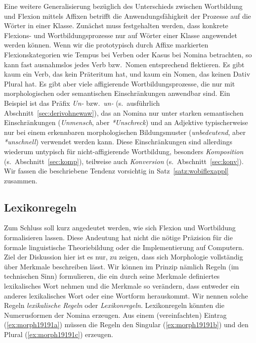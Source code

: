 Eine weitere Generalisierung bezüglich des Unterschieds zwischen Wortbildung und Flexion mittels Affixen betrifft die Anwendungsfähigkeit der Prozesse auf die Wörter in einer Klasse.
Zunächst muss festgehalten werden, dass konkrete Flexions- und Wortbildungsprozesse nur auf Wörter einer Klasse angewendet werden können.
Wenn wir die prototypisch durch Affixe markierten Flexionskategorien wie Tempus bei Verben oder Kasus bei Nomina betrachten, so kann fast ausnahmslos jedes Verb bzw.\ Nomen entsprechend flektieren.
Es gibt \zB kaum ein Verb, das kein Präteritum hat, und kaum ein Nomen, das keinen Dativ Plural hat.
Es gibt aber viele affigierende Wortbildungsprozesse, die nur mit morphologischen oder semantischen Einschränkungen anwendbar sind.
Ein Beispiel ist das Präfix \textit{Un-} bzw.\ \textit{un-} (s.\ ausführlich Abschnitt~\ref{sec:derivohnewaw}), das an Nomina nur unter starken semantischen Einschränkungen (\textit{Unmensch}, aber \textit{*Unschreck}) und an Adjektive typischerweise nur bei einem erkennbaren morphologischen Bildungsmuster (\textit{unbedeutend}, aber \textit{*unschnell}) verwendet werden kann.
Diese Einschränkungen sind allerdings wiederum untypisch für nicht-affigierende Wortbildung, besonders \textit{Komposition} (s.\ Abschnitt~\ref{sec:komp}), teilweise auch \textit{Konversion} (s.\ Abschnitt~\ref{sec:konv}).
Wir fassen die beschriebene Tendenz vorsichtig in Satz~\ref{satz:wobiflexappl} zusammen.



\subsection{Lexikonregeln}

\label{sec:lexikonregel}

Zum Schluss soll kurz angedeutet werden, wie sich Flexion und Wortbildung formalisieren lassen.
Diese Andeutung hat nicht die nötige Präzision für die formale linguistische Theoriebildung oder die Implementierung auf Computern.
Ziel der Diskussion hier ist es nur, zu zeigen, dass sich Morphologie vollständig über Merkmale beschreiben lässt.
Wir können im Prinzip nämlich Regeln (im technischen Sinn) formulieren, die ein durch seine Merkmale definiertes lexikalisches Wort nehmen und die Merkmale so verändern, dass entweder ein anderes lexikalisches Wort oder eine Wortform herauskommt.
Wir nennen solche Regeln \textit{lexikalische Regeln} oder \textit{Lexikonregeln}.
Lexikonregeln könnten \zB die Numerusformen der Nomina erzeugen.
Aus einem (vereinfachten) Eintrag (\ref{ex:morph19191a}) müssen die Regeln den Singular (\ref{ex:morph19191b}) und den Plural (\ref{ex:morph19191c}) erzeugen.

